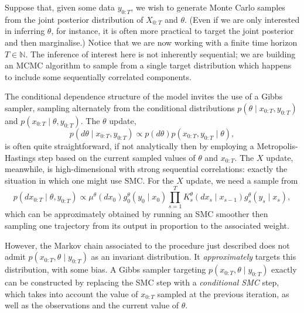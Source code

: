 Suppose that, given some data $y_{0:T}$, we wish to generate Monte Carlo samples from the joint posterior distribution of $X_{0:T}$ and $\theta$. (Even if we are only interested in inferring $\theta$, for instance, it is often more practical to target the joint posterior and then marginalise.)
Notice that we are now working with a finite time horizon $T\in\mathbb{N}$. The inference of interest here is not inherently sequential; we are building an MCMC algorithm to sample from a single target distribution which happens to include some sequentially correlated components.


The conditional dependence structure of the model invites the use of a Gibbs sampler, sampling alternately from the conditional distributions $p(\theta \mid x_{0:T}, y_{0:T})$ and $p(x_{0:T} \mid \theta, y_{0:T})$.
The $\theta$ update,
\begin{equation*}
p(d\theta \mid x_{0:T}, y_{0:T}) \propto p(d\theta) p(x_{0:T}, y_{0:T} \mid \theta) ,
\end{equation*}
is often quite straightforward, if not analytically then by employing a Metropolis-Hastings step based on the current sampled values of $\theta$ and $x_{0:T}$. 
The $X$ update, meanwhile, is high-dimensional with strong sequential correlations: exactly the situation in which one might use SMC. 
For the $X$ update, we need a sample from
\begin{equation}\label{eq:PG_Xposterior}
p(dx_{0:T} \mid \theta, y_{0:T}) 
\propto \mu^\theta(dx_0) g_0^\theta(y_0\mid x_0) \prod_{s=1}^T K_s^\theta(dx_s \mid x_{s-1}) g_s^\theta(y_s \mid x_s) ,
\end{equation}
which can be approximately obtained by running an SMC smoother then sampling one trajectory from its output in proportion to the associated weight.

However, the Markov chain associated to the procedure just described does not admit $p(x_{0:T},\theta \mid y_{0:T})$ as an invariant distribution. It \emph{approximately} targets this distribution, with some bias.
A Gibbs sampler targeting $p(x_{0:T},\theta \mid y_{0:T})$ exactly can be constructed by replacing the SMC step with a \emph{conditional SMC} step, which takes into account the value of $x_{0:T}$ sampled at the previous iteration, as well as the observations and the current value of $\theta$.

